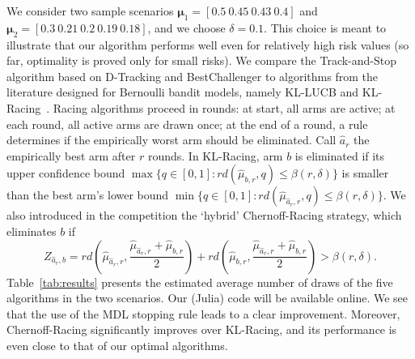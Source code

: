 \documentclass{colt2016} %
\begin{document}


We consider two sample scenarios $\bm\mu_1=[0.5 \ 0.45 \ 0.43 \ 0.4]$ and $\bm\mu_2=[0.3 \ 0.21 \ 0.2 \ 0.19 \ 0.18]$, and we choose $\delta=0.1$. This choice is meant to illustrate that our algorithm performs well even for relatively high risk values (so far, optimality is proved only for small risks).
We compare the Track-and-Stop algorithm based on D-Tracking and BestChallenger to algorithms from the literature designed for Bernoulli bandit models, namely KL-LUCB and KL-Racing~\citep{COLT13}. Racing algorithms proceed in rounds: at start, all arms are active; at each round, all active arms are drawn once; at the end of a round, a rule determines if the empirically worst arm should be eliminated. Call $\hat{a}_r$ the empirically best arm after $r$ rounds. In KL-Racing, arm $b$ is eliminated if its upper confidence bound $ \max \{q \in [0,1] : r d(\hat{\mu}_{b,r},q ) \leq \beta(r,\delta)\}$ is smaller than the best arm's lower bound $\min \{q \in [0,1] : r d(\hat{\mu}_{\hat{a}_r,r},q ) \leq \beta(r,\delta)\}$. We also introduced in the competition the `hybrid' Chernoff-Racing strategy, which eliminates $b$ if  \[Z_{\hat{a}_r, b} = rd\left(\hat{\mu}_{\hat{a}_r,r} , \frac{\hat{\mu}_{\hat{a}_r,r}  + \hat{\mu}_{b,r} }{2}\right) + rd\left(\hat{\mu}_{b,r} , \frac{\hat{\mu}_{\hat{a}_r,r}  + \hat{\mu}_{b,r} }{2}\right) > \beta(r,\delta).\]
Table~\ref{tab:results} presents the estimated average number of draws of the five algorithms in the two scenarios. Our (Julia) code will be available online. We see that the use of the MDL stopping rule leads to a clear improvement. Moreover, Chernoff-Racing significantly improves over KL-Racing, and its performance is even close to that of our optimal algorithms. 
\end{document}
